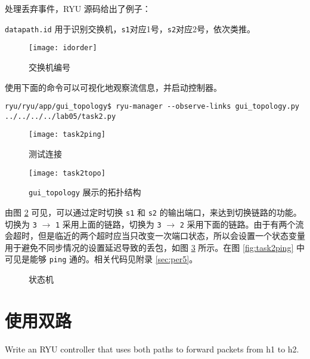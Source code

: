 
    处理丢弃事件，RYU 源码给出了例子：


    \verb"datapath.id" 用于识别交换机，\verb"s1"对应1号，\verb"s2"对应2号，依次类推。

    \begin{figure}[H]
        \centering
        \texttt{[image: idorder]}
        \caption{交换机编号}\label{fig:idorder}
    \end{figure}

    使用下面的命令可以可视化地观察流信息\cite{gui}，并启动控制器。
    \begin{lstlisting}[style=commandshell]
        ryu/ryu/app/gui_topology$ ryu-manager --observe-links gui_topology.py ../../../../lab05/task2.py\end{lstlisting}

    \begin{figure}[H]
        \centering
        \begin{minipage}{0.48\textwidth}
            \centering
            \texttt{[image: task2ping]}
            \caption{测试连接}\label{fig:task2ping}
        \end{minipage}
        \begin{minipage}{0.48\textwidth}
            \centering
            \texttt{[image: task2topo]}
            \caption{\texttt{gui\_topology} 展示的拓扑结构}\label{fig:task2topo}
        \end{minipage}
    \end{figure}

    由图 \ref{fig:task2topo} 可见，可以通过定时切换 \verb"s1" 和 \verb"s2" 的输出端口，来达到切换链路的功能。切换为 \verb"3" $\rightarrow$ \verb"1" 采用上面的链路，切换为 \verb"3" $\rightarrow$ \verb"2" 采用下面的链路。由于有两个流会超时，但是临近的两个超时应当只改变一次端口状态，所以会设置一个状态变量用于避免不同步情况的设置延迟导致的丢包，如图 \ref{fig:pathstate} 所示。在图 \ref{fig:task2ping} 中可见是能够 \verb"ping" 通的。相关代码见附录 \ref{sec:per5}。

    \begin{figure}[H]
        \centering
        
        \caption{状态机}\label{fig:pathstate}
    \end{figure}

    \section{使用双路}
    Write an RYU controller that uses both paths to forward packets from h1 to h2.

